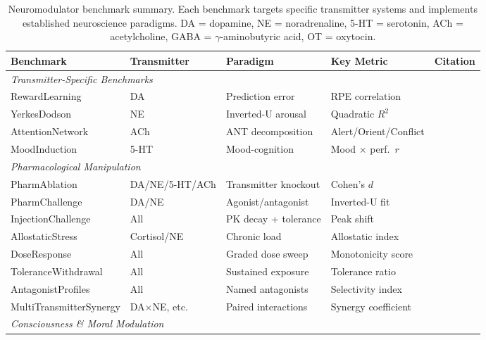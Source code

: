 \documentclass[11pt,letterpaper]{article}
\begin{document}
\begin{table}[t]
\centering
\caption{Neuromodulator benchmark summary. Each benchmark targets specific transmitter systems and implements established neuroscience paradigms. DA = dopamine, NE = noradrenaline, 5-HT = serotonin, ACh = acetylcholine, GABA = $\gamma$-aminobutyric acid, OT = oxytocin.}
\label{tab:neuromod}
\scriptsize
\begin{tabular}{@{}p{2.5cm}p{2.1cm}p{2.3cm}p{2.1cm}p{2.6cm}@{}}
\toprule
\textbf{Benchmark} & \textbf{Transmitter} & \textbf{Paradigm} & \textbf{Key Metric} & \textbf{Citation} \\
\midrule
\multicolumn{5}{l}{\emph{Transmitter-Specific Benchmarks}} \\
RewardLearning & DA & Prediction error & RPE correlation & \citet{schultz1997dopamine} \\
YerkesDodson & NE & Inverted-U arousal & Quadratic $R^2$ & \citet{yerkes1908relation} \\
AttentionNetwork & ACh & ANT decomposition & Alert/Orient/Conflict & \citet{posner1990attention} \\
MoodInduction & 5-HT & Mood-cognition & Mood $\times$ perf.\ $r$ & \citet{dayan2009serotonin} \\
\midrule
\multicolumn{5}{l}{\emph{Pharmacological Manipulation}} \\
PharmAblation & DA/NE/5-HT/ACh & Transmitter knockout & Cohen's $d$ & \citet{doya2002metalearning} \\
PharmChallenge & DA/NE & Agonist/antagonist & Inverted-U fit & \citet{arnsten2011catecholamine} \\
InjectionChallenge & All & PK decay + tolerance & Peak shift & \citet{arnsten2011catecholamine} \\
AllostaticStress & Cortisol/NE & Chronic load & Allostatic index & \citet{mcewen1998stress} \\
DoseResponse & All & Graded dose sweep & Monotonicity score & \citet{clark1937log} \\
ToleranceWithdrawal & All & Sustained exposure & Tolerance ratio & \citet{koob2001drug} \\
AntagonistProfiles & All & Named antagonists & Selectivity index & \citet{stahl2013essential} \\
MultiTransmitterSynergy & DA$\times$NE, etc. & Paired interactions & Synergy coefficient & \citet{doya2002metalearning} \\
\midrule
\multicolumn{5}{l}{\emph{Consciousness \& Moral Modulation}} \\

\end{tabular}
\end{table}
\end{document}
